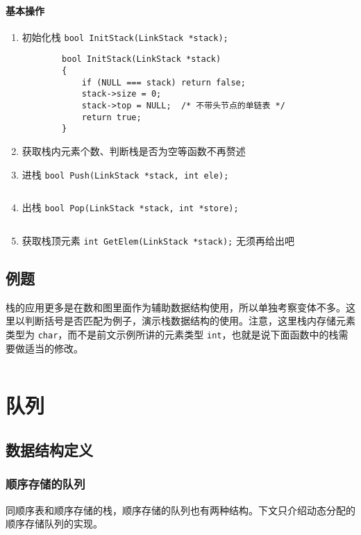 \documentclass{ctexart}
\begin{document}
\paragraph{基本操作}
\begin{enumerate}
    \item 初始化栈 \texttt{bool InitStack(LinkStack *stack);}
        \begin{verbatim}
        bool InitStack(LinkStack *stack)
        {
            if (NULL === stack) return false;
            stack->size = 0;
            stack->top = NULL;  /* 不带头节点的单链表 */
            return true;
        }
        \end{verbatim}

    \item 获取栈内元素个数、判断栈是否为空等函数不再赘述

    \item 进栈 \texttt{bool Push(LinkStack *stack, int ele);}
        \inputminted{c}{codes/push-into-link-stack.c}

    \item 出栈 \texttt{bool Pop(LinkStack *stack, int *store);}
        \inputminted{c}{codes/pop-from-link-stack.c}

    \item 获取栈顶元素 \texttt{int GetElem(LinkStack *stack);} 无须再给出吧
\end{enumerate}

\subsection{例题}
栈的应用更多是在数和图里面作为辅助数据结构使用，所以单独考察变体不多。这里以判断括号是否匹配为例子，演示栈数据结构的使用。注意，这里栈内存储元素类型为 \texttt{char}，而不是前文示例所讲的元素类型 \texttt{int}，也就是说下面函数中的栈需要做适当的修改。\label{is-brackets-valid}
\inputminted{c}{codes/is-brackets-valid.c}


\section{队列}
\subsection{数据结构定义}
\subsubsection{顺序存储的队列}
同顺序表和顺序存储的栈，顺序存储的队列也有两种结构。下文只介绍动态分配的顺序存储队列的实现。
\end{document}
